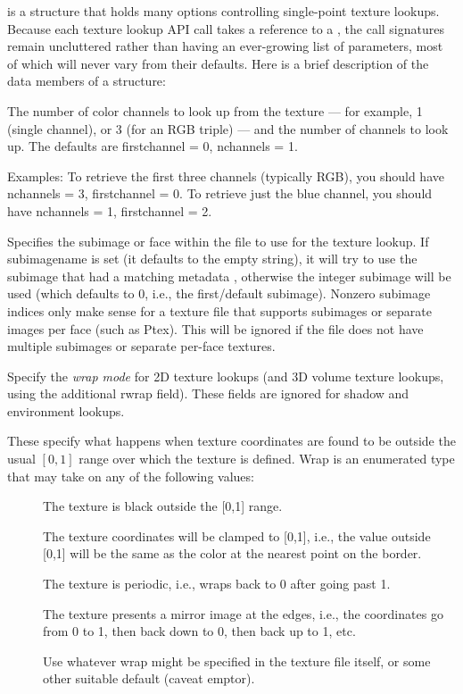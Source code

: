 \TextureOpt is a structure that holds many options controlling
single-point texture lookups.  Because each texture lookup API call takes
a reference to a \TextureOpt, the call signatures remain uncluttered
rather than having an ever-growing list of parameters, most of which
will never vary from their defaults.  Here is a brief description of
the data members of a \TextureOpt structure:

The number of color channels to look up from the texture --- for
example, 1 (single channel), or 3 (for an RGB triple) --- and the number
of channels to look up.  The defaults are firstchannel = 0, nchannels =
1.

Examples: To retrieve the first three channels (typically RGB), you
should have nchannels = 3, firstchannel = 0.  To retrieve just the blue
channel, you should have nchannels = 1, firstchannel = 2.
\apiend

Specifies the subimage or face within the file to use for the texture lookup.
If {\cf subimagename} is set (it defaults to the empty string), it will
try to use the subimage that had a matching metadata
, otherwise the integer {\cf subimage} will be
used (which defaults to 0, i.e., the first/default subimage).  Nonzero
subimage indices only make sense for a texture file that supports
subimages or separate images per face (such as Ptex).  This will be
ignored if the file does not have multiple subimages or separate
per-face textures.
\apiend

Specify the \emph{wrap mode} for 2D texture lookups (and 3D volume
texture lookups, using the additional {\cf rwrap} field).  These fields
are ignored for shadow and environment lookups.

These specify what happens when texture coordinates are found to be
outside the usual $[0,1]$ range over which the texture is defined.
{\cf Wrap} is an enumerated type that may take on any of the
following values:
\begin{description}
\item[\spc] \spc
\item[\rm {}] The texture is black outside the [0,1] range.
\item[\rm {}] The texture coordinates will be clamped to
  [0,1], i.e., the value outside [0,1] will be the same as the color
  at the nearest point on the border.
\item[\rm {}] The texture is periodic, i.e., wraps back
  to 0 after going past 1.
\item[\rm {}] The texture presents a mirror image at the
  edges, i.e., the coordinates go from 0 to 1, then back down to 0, then
  back up to 1, etc.
\item[\rm {}] Use whatever wrap might be specified in the
  texture file itself, or some other suitable default (caveat emptor).
\end{description}

